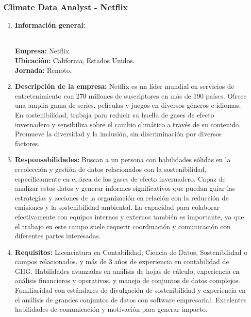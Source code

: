 \documentclass[12pt]{article}
\begin{document}
            \subsubsection{Climate Data Analyst - Netflix}
                 \begin{enumerate}
                    \item \textbf{Información general:}
                    
                        \textbf{\\Empresa:} Netflix.
                        \textbf{\\Ubicación:} California, Estados Unidos.
                        \textbf{\\Jornada:} Remoto.

                    \item \textbf{Descripción de la empresa:}
                        Netflix es un líder mundial en servicios de entretenimiento con 270 millones de suscriptores en más de 190 países. Ofrece una amplia gama de series, películas y juegos en diversos géneros e idiomas. En sostenibilidad, trabaja para reducir su huella de gases de efecto invernadero y sensibiliza sobre el cambio climático a través de su contenido. Promueve la diversidad y la inclusión, sin discriminación por diversos factores.

                    \item \textbf{Responsabilidades:}
                        Buscan a un persona con habilidades sólidas en la recolección y gestión de datos relacionados con la sostenibilidad, específicamente en el área de los gases de efecto invernadero. Capaz de analizar estos datos y generar informes significativos que puedan guiar las estrategias y acciones de la organización en relación con la reducción de emisiones y la sostenibilidad ambiental. La capacidad para colaborar efectivamente con equipos internos y externos también es importante, ya que el trabajo en este campo suele requerir coordinación y comunicación con diferentes partes interesadas.

                    \item \textbf{Requisitos:}
                        Licenciatura en Contabilidad, Ciencia de Datos, Sostenibilidad o campos relacionados, y más de 3 años de experiencia en contabilidad de GHG. Habilidades avanzadas en análisis de hojas de cálculo, experiencia en análisis financieros y operativos, y manejo de conjuntos de datos complejos. Familiaridad con estándares de divulgación de sostenibilidad y experiencia en el análisis de grandes conjuntos de datos con software empresarial. Excelentes habilidades de comunicación y motivación para generar impacto.


\end{enumerate}
\end{document}
